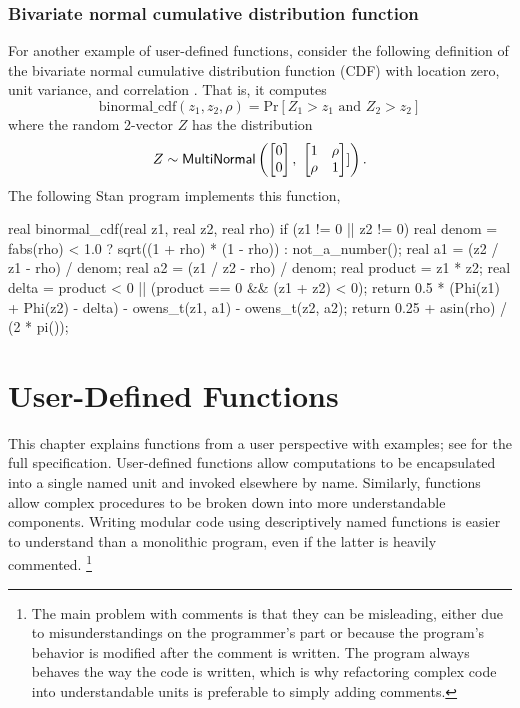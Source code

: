 \subsection{Bivariate normal cumulative distribution function}

For another example of user-defined functions, consider the following
definition of the bivariate normal cumulative distribution function
(CDF) with location zero, unit variance, and correlation .
That is, it computes
\[
\mbox{binormal\_cdf}(z_1, z_2, \rho) = \mbox{Pr}[Z_1 > z_1 \mbox{ and } Z_2 > z_2]
\]
where the random 2-vector $Z$ has the distribution
\[
Z \sim \mbox{\sf MultiNormal}\left(
\begin{bmatrix}
0 \\
0
\end{bmatrix}, \
\begin{bmatrix}
1 & \rho
\\
\rho & 1
\end{bmatrix}
]\right).
\]
%
The following Stan program implements this function,
%
\begin{stancode}
real binormal_cdf(real z1, real z2, real rho) {
  if (z1 != 0 || z2 != 0) {
    real denom = fabs(rho) < 1.0 ? sqrt((1 + rho) * (1 - rho)) : not_a_number();
    real a1 = (z2 / z1 - rho) / denom;
    real a2 = (z1 / z2 - rho) / denom;
    real product = z1 * z2;
    real delta = product < 0 || (product == 0 && (z1 + z2) < 0);
    return 0.5 * (Phi(z1) + Phi(z2) - delta) - owens_t(z1, a1) - owens_t(z2, a2);
  }
  return 0.25 + asin(rho) / (2 * pi());
}
\end{stancode}


\chapter{User-Defined Functions}\label{functions-programming.chapter}

\noindent
This chapter explains functions from a user perspective with examples;
see \refchapter{functions} for the full specification.  User-defined
functions allow computations to be encapsulated into a single named
unit and invoked elsewhere by name.  Similarly, functions allow
complex procedures to be broken down into more understandable
components.  Writing modular code using descriptively named functions
is easier to understand than a monolithic program, even if the latter
is heavily commented.%
%
\footnote{The main problem with comments is that they can be
  misleading, either due to misunderstandings on the programmer's part
  or because the program's behavior is modified after the comment is
  written.  The program always behaves the way the code is written,
  which is why refactoring complex code into understandable units is
  preferable to simply adding comments.}

